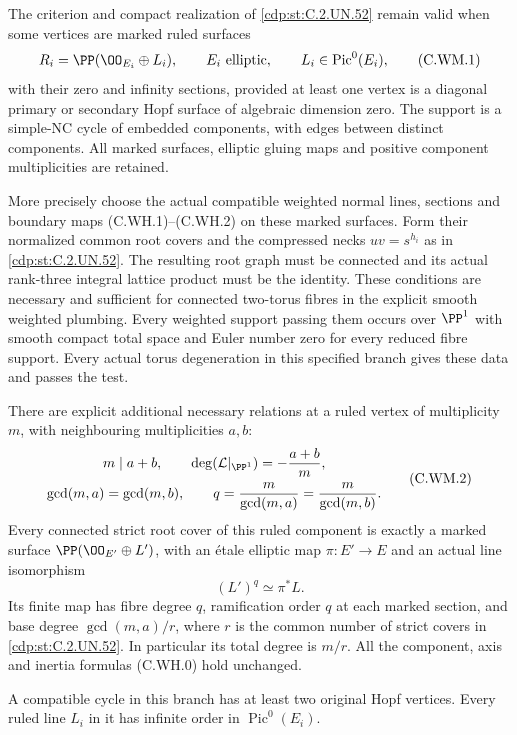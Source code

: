 
\begin{proposition}\label{cdp:st:C.2.UN.56}
The criterion and compact realization of \ref{cdp:st:C.2.UN.52}
remain valid when some vertices are marked ruled surfaces
\[
        R_i=\PP(\OO_{E_i}\oplus L_i),\qquad
        E_i\ \hbox{elliptic},\qquad L_i\in\operatorname{Pic}^0(E_i),
\tag{C.WM.1}\label{cdp:eq:C.WM.1}
\]
with their zero and infinity sections, provided at least
one vertex is a diagonal primary or secondary Hopf surface
of algebraic dimension zero. The support is a simple-NC
cycle of embedded components, with edges between distinct
components. All marked surfaces, elliptic gluing maps and
positive component multiplicities are retained.

More precisely choose the actual compatible weighted normal
lines, sections and boundary maps (C.WH.1)--(C.WH.2) on
these marked surfaces. Form their normalized common root
covers and the compressed necks $uv=s^{h_i}$ as in \ref{cdp:st:C.2.UN.52}.
The resulting root graph must be connected and its actual
rank-three integral lattice product must be the identity.
These conditions are necessary and sufficient for connected
two-torus fibres in the explicit smooth weighted plumbing.
Every weighted support passing them occurs over $\PP^1$
with smooth compact total space and Euler number zero for
every reduced fibre support. Every actual torus degeneration
in this specified branch gives these data and passes the test.

There are explicit additional necessary relations at a ruled
vertex of multiplicity $m$, with neighbouring multiplicities
$a,b$:
\[
 \begin{gathered}
      m\mid a+b,\qquad
      \deg(\mathcal L|_{\PP^1})=-\frac{a+b}{m},\\
      \gcd(m,a)=\gcd(m,b),\qquad
      q=\frac{m}{\gcd(m,a)}
         =\frac{m}{\gcd(m,b)}.
 \end{gathered}
\tag{C.WM.2}\label{cdp:eq:C.WM.2}
\]
Every connected strict root cover of this ruled component
is exactly a marked surface
$\PP(\OO_{E'}\oplus L')$, with an \'{e}tale elliptic map
$\pi:E'\to E$ and an actual line isomorphism
\[
                   (L')^q\simeq\pi^*L.
\tag{C.WM.3}\label{cdp:eq:C.WM.3}
\]
Its finite map has fibre degree $q$, ramification order
$q$ at each marked section, and base degree
$\gcd(m,a)/r$, where $r$ is the common number of strict
covers in \ref{cdp:st:C.2.UN.52}. In particular its total degree is $m/r$.
All the component, axis and inertia formulas (C.WH.0)
hold unchanged.

A compatible cycle in this branch has at least two
original Hopf vertices. Every ruled line $L_i$ in it
has infinite order in $\operatorname{Pic}^0(E_i)$.
\end{proposition}

